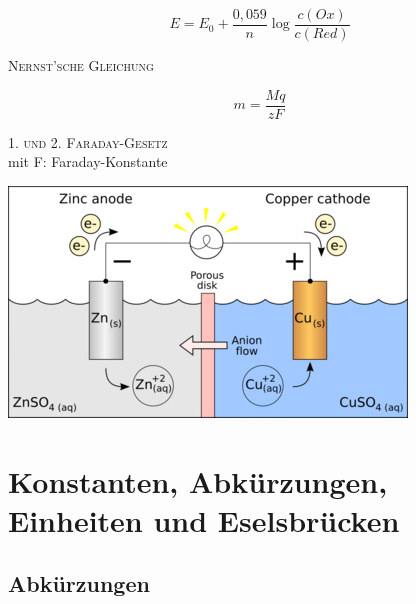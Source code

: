 \documentclass[12pt,a4paper]{article}
\renewcommand{\=}[1]{\stackrel{#1}{=}}
\theoremstyle{definition}
\theoremstyle{remark}
\begin{document}
\begin{center}
\begin{minipage}[t]{.45\linewidth}
\vspace{0pt}

\begin{framed}
$$E = E_0 + \frac{0,059}{n} \log \frac{c(Ox)}{c(Red)}$$
\begin{center}
\textsc{Nernst'sche Gleichung}
\end{center}
\end{framed}

\end{minipage}%
\hspace{0.02\linewidth}
\begin{minipage}[t]{.45\linewidth}
\vspace{0pt}

\begin{framed}
$$m = \frac{Mq}{zF}$$
\begin{center}
\textsc{1. und 2. Faraday-Gesetz}\\
\scriptsize{mit F: Faraday-Konstante}
\end{center}
\end{framed}

\end{minipage}
\end{center}

\noindent
\includegraphics[width=\textwidth]{pic/galva2.png}

\newpage
\section{Konstanten, Abkürzungen, Einheiten und Eselsbrücken}

\subsection{Abkürzungen}
\end{document}
